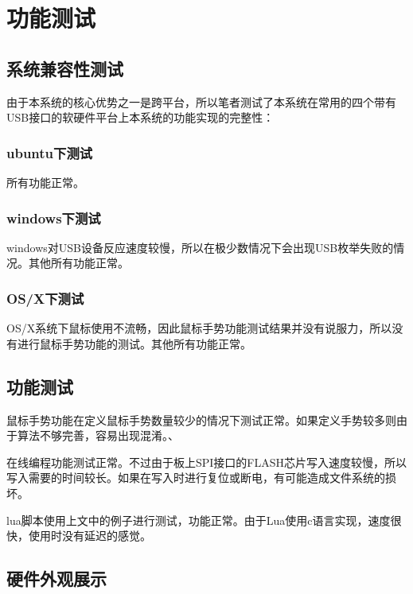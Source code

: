 
\chapter{功能测试}
\section{系统兼容性测试}
由于本系统的核心优势之一是跨平台，所以笔者测试了本系统在常用的四个带有USB接口的软硬件平台上本系统的功能实现的完整性：
\subsection{ubuntu下测试}
所有功能正常。
\subsection{windows下测试}
windows对USB设备反应速度较慢，所以在极少数情况下会出现USB枚举失败的情况。其他所有功能正常。
\subsection{OS/X下测试}
OS/X系统下鼠标使用不流畅，因此鼠标手势功能测试结果并没有说服力，所以没有进行鼠标手势功能的测试。其他所有功能正常。

\section{功能测试}


鼠标手势功能在定义鼠标手势数量较少的情况下测试正常。如果定义手势较多则由于算法不够完善，容易出现混淆。、

在线编程功能测试正常。不过由于板上SPI接口的FLASH芯片写入速度较慢，所以写入需要的时间较长。如果在写入时进行复位或断电，有可能造成文件系统的损坏。

lua脚本使用上文中的例子进行测试，功能正常。由于Lua使用c语言实现，速度很快，使用时没有延迟的感觉。

\section{硬件外观展示}








